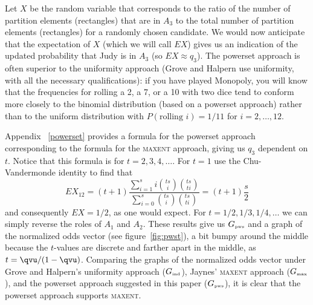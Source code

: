 Let $X$ be the random variable that corresponds to the ratio of the
number of partition elements (rectangles) that are in $A_{3}$ to the
total number of partition elements (rectangles) for a randomly chosen
candidate. We would now anticipate that the expectation of $X$ (which
we will call $EX$) gives us an indication of the updated probability
that Judy is in $A_{3}$ (so $EX\approx{}q_{3}$). The powerset approach
is often superior to the uniformity approach (Grove and Halpern use
uniformity, with all the necessary qualifications): if you have played
Monopoly, you will know that the frequencies for rolling a 2, a 7, or
a 10 with two dice tend to conform more closely to the binomial
distribution (based on a powerset approach) rather than to the uniform
distribution with $P(\mbox{rolling }i)=1/11$ for $i=2,{\ldots},12$.

Appendix ~\ref{powerset} provides a formula for the powerset approach
corresponding to the formula for the \textsc{maxent} approach, giving
us $q_{3}$ dependent on $t$. Notice that this formula is for
$t=2,3,4,\ldots$. For $t=1$ use the Chu-Vandermonde identity to find
that
\begin{displaymath}
  EX_{12}=(t+1)\frac{\sum_{i=1}^{s}i\binom{ts}{i}\binom{ts}{ti}}{\sum_{i=0}^{s}\binom{ts}{i}\binom{ts}{ti}}=(t+1)\frac{s}{2}  
\end{displaymath}
and consequently $EX=1/2$, as one would expect. For
$t=1/2,1/3,1/4,\ldots$ we can simply reverse the roles of $A_{1}$ and
$A_{2}$. These results give us $G_{\mbox{\tiny pws}}$ and a graph of
the normalized odds vector (see figure~\ref{fig:pwst}), a bit bumpy
around the middle because the $t$-values are discrete and farther
apart in the middle, as $t={\qvu}/(1-{\qvu})$. Comparing the graphs of
the normalized odds vector under Grove and Halpern's uniformity
approach ($G_{\mbox{\tiny ind}}$), Jaynes' \textsc{maxent} approach
($G_{\mbox{\tiny max}}$), and the powerset approach suggested in this
paper ($G_{\mbox{\tiny pws}}$), it is clear that the powerset approach
supports \textsc{maxent}.

